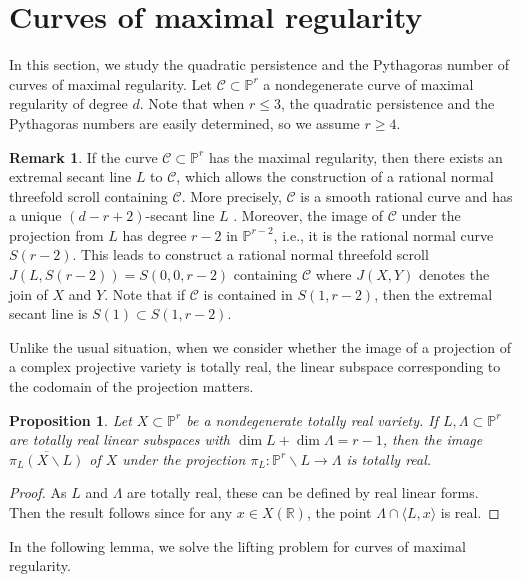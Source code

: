 \documentclass[11pt,letterpaper,reqno]{amsart}
\theoremstyle{plain}
\newtheorem{proposition}[theorem]{Proposition}
\theoremstyle{definition}
\newtheorem{remark}[theorem]{Remark}
\newtheorem{open problem}[theorem]{Open Problem}
\newtheorem{remark and notation}[theorem]{Remark and Notation}
\newtheorem{remark and definition}[theorem]{Remark and Definition}
\newtheorem{definition and notation}[theorem]{Definition and Notation}
\newtheorem{notation and convention}[theorem]{Notation and Convention}
\newtheorem{notation and remark}[theorem]{Notation and Remark}
\newtheorem{convention and notation}[theorem]{Convention and Notation}
\def \p {\mathbb{P}}
\def \r {\mathbb{R}}
\begin{document}
\section{Curves of maximal regularity}\label{sec:MaxRegCurves}
In this section, we study the quadratic persistence and the Pythagoras number of curves of maximal regularity. 
Let $\mathcal{C}\subset\p^r$ a nondegenerate curve of maximal regularity of degree $d$. Note that when $r\leq 3$, the quadratic persistence and the Pythagoras numbers are easily determined, so we assume $r\geq 4$.
\begin{remark}
If the curve $\mathcal{C}\subset\p^r$ has the maximal regularity, then there exists an extremal secant line $L$ to $\mathcal{C}$, which allows the construction of a rational normal threefold scroll containing $\mathcal{C}$.  
More precisely, $\mathcal{C}$ is a smooth rational curve and has a unique $(d - r + 2)$-secant line $L$ \cite{MR0704401}.  
Moreover, the image of $\mathcal{C}$ under the projection from $L$ has degree $r - 2$ in $\mathbb{P}^{r-2}$, i.e., it is the rational normal curve $S(r-2)$.
This leads to construct a rational normal threefold scroll $J(L,S(r-2))=S(0,0,r-2)$ containing $\mathcal{C}$ where $J(X,Y)$ denotes the join of $X$ and $Y$.
Note that if $\mathcal{C}$ is contained in $S(1, r-2)$, then the extremal secant line is $S(1) \subset S(1,r-2)$.  
\end{remark}

Unlike the usual situation, when we consider whether the image of a projection of a complex projective variety is totally real, the linear subspace corresponding to the codomain of the projection matters.

\begin{proposition}\label{prop:tr_projection}
    Let $X\subset\p^r$ be a nondegenerate totally real variety. If $L,\Lambda\subset\p^r$ are totally real linear subspaces with $\dim L+\dim\Lambda=r-1$, then the image $\overline{\pi_L(X\backslash L)}$ of $X$ under the projection $\pi_L:\p^r\backslash L\to \Lambda$ is totally real.
\end{proposition}
\begin{proof}
    As $L$ and $\Lambda$ are totally real, these can be defined by real linear forms.
    Then the result follows since for any $x\in X(\r)$, the point $\Lambda\cap \langle L,x\rangle$ is real.
\end{proof}

In the following lemma, we solve the lifting problem for curves of maximal regularity.
\end{document}
